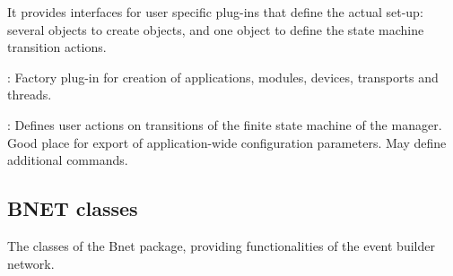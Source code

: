 \begin{description}
\begin{compactenum}
      \item It provides interfaces for user specific plug-ins that define 
      the actual set-up: \\
      several  objects to create objects, and 
      one  object to define the state machine transition actions.
\end{compactenum}

\item[\class{dabc::Factory}] : 
	Factory plug-in for creation of applications, modules, devices, transports and threads.

\item[\class{dabc::Application}] : 
Defines user actions on transitions of the finite state machine of the manager.
Good place for export of application-wide configuration parameters. 
May define additional commands.
\end{description}

\subsection{BNET classes}
\label{prog_bnet_classes}
The classes of the Bnet package, providing functionalities of the event builder network.

